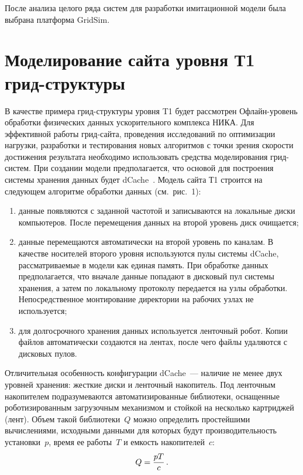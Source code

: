 \begin{multicols}{2}
   После анализа целого ряда систем для разработки имитационной модели 
была выбрана платформа GridSim. 
  
\section{Моделирование сайта уровня Т1 грид-структуры}

   В качестве примера грид-струк\-ту\-ры уровня T1 будет рассмотрен 
   Оф\-лайн-уро\-вень обработки физических данных ускорительного 
комплекса \mbox{НИКА}. Для эффективной работы грид-сай\-та, проведения 
исследований по оптимизации нагрузки, разработки и тестирования новых 
алгоритмов с точки зрения скорости достижения результата необходимо 
использовать средства моделирования грид-сис\-тем. При создании модели 
предполагается, что основой для построения системы хранения данных будет 
dCache~\cite{8-kor}. Модель сайта Т1 строится на следующем алгоритме 
обработки данных (см.\ рис.~1): 
   \begin{enumerate}[(1)]
\item данные появляются с заданной частотой и записываются на 
локальные диски компьютеров. После перемещения данных на второй 
уровень диск очищается;
\item данные перемещаются автоматически на второй уровень по 
каналам. В качестве носителей второго уровня используются пулы 
системы dCache, рассматриваемые в модели как единая память. При 
обработке данных предполагается, что вначале данные попадают в 
дисковый пул системы хранения, а затем по локальному протоколу 
передается на узлы обработки. Непосредственное монтирование 
директории на рабочих узлах не используется;
\item для долгосрочного хранения данных используется ленточный 
робот. Копии файлов автоматически создаются на лентах, после чего 
файлы удаляются с дисковых пулов. 
\end{enumerate}

   Отличительная особенность конфигурации dCache~--- наличие не менее двух 
уровней хранения: жесткие диски и ленточный накопитель. Под ленточным 
накопителем подразумеваются автоматизированные биб\-лио\-те\-ки, 
оснащенные роботизированным загрузочным механизмом и стойкой на 
несколько картриджей (лент). Объем такой биб\-лио\-те\-ки~$Q$ можно определить 
простейшими вы\-чис\-ле\-ни\-ями, исходными данными для которых будут 
производительность установки~$p$, время ее работы~$T$ и емкость 
накопителей~$c$:
   $$
   Q=\displaystyle\frac{\displaystyle pT\mathstrut}{\displaystyle c\mathstrut}\,.
   $$
   

\end{multicols}
